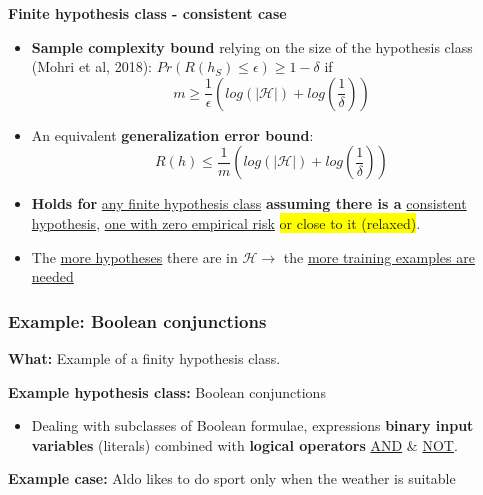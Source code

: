 \documentclass[12pt, a4paper]{article}
\begin{document}
\bigskip \bigskip

\textbf{Finite hypothesis class - consistent case}

\begin{itemize}
  \item \textbf{Sample complexity bound} relying on the size of the hypothesis class (Mohri et al, 2018): $Pr(R(h_S) \leq \epsilon) \geq 1 - \delta$ if
  \[
  m \geq \frac{1}{\epsilon}(log(|\mathcal{H}|) + log(\frac{1}{\delta}))
  \]
  \item An equivalent \textbf{generalization error bound}:
  \[
  R(h) \leq \frac{1}{m}(log(|\mathcal{H}|) + log(\frac{1}{\delta}))
  \]
  \item \textbf{Holds for} \uline{any finite hypothesis class}
  \textbf{assuming there is a} \uline{consistent hypothesis}, \uline{one with zero empirical risk} \colorbox{Yellow}{or close to it (relaxed)}.
  \item The \uline{more hypotheses} there are in $\mathcal{H} \rightarrow$ the \uline{more training examples are needed}
\end{itemize}


\subsubsection{Example: Boolean conjunctions
}\label{example-boolean-conjunctions}


\textbf{What:} Example of a finity hypothesis class.

\bigskip \bigskip


\textbf{Example hypothesis class:} Boolean conjunctions

\begin{itemize}
  \item Dealing with subclasses of Boolean formulae, expressions \textbf{binary input variables} (literals) combined with \textbf{logical operators} \uline{AND} \& \uline{NOT}.
\end{itemize}

\bigskip \bigskip


\textbf{Example case:} Aldo likes to do sport only when the weather is suitable
\end{document}
